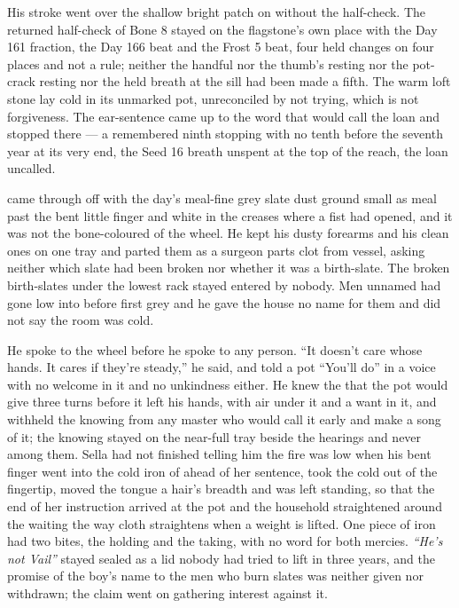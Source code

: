 His stroke went over the shallow bright patch on  without the half-check. The returned half-check of Bone 8 stayed on the flagstone’s own place with the Day 161 fraction, the Day 166 beat and the Frost 5 beat, four held changes on four places and not a rule; neither the handful nor the thumb’s resting nor the pot-crack resting nor the held breath at the sill had been made a fifth. The warm loft stone lay cold in its unmarked pot, unreconciled by not trying, which is not forgiveness. The ear-sentence came up to the word that would call the loan and stopped there --- a remembered ninth stopping with no tenth before the seventh year at its very end, the Seed 16 breath unspent at the top of the reach, the loan uncalled.

 came through  off  with the day’s meal-fine grey slate dust ground small as meal past the bent little finger and white in the creases where a fist had opened, and it was not the bone-coloured  of the wheel. He kept his dusty forearms and his clean ones on one tray and parted them as a surgeon parts clot from vessel, asking neither which slate had been broken nor whether it was a birth-slate. The broken birth-slates under the lowest rack stayed entered by nobody. Men unnamed had gone low into  before first grey and he gave the house no name for them and did not say the room was cold.

He spoke to the wheel before he spoke to any person. “It doesn’t care whose hands. It cares if they’re steady,” he said, and told a pot “You’ll do” in a voice with no welcome in it and no unkindness either. He knew the  that the pot would give three turns before it left his hands, with air under it and a want in it, and withheld the knowing from any  master who would call it early and make a song of it; the knowing stayed on the near-full tray beside the hearings and never among them. Sella had not finished telling him the fire was low when his bent finger went into the cold iron of  ahead of her sentence, took the cold out of the fingertip, moved the tongue a hair’s breadth and was left standing, so that the end of her instruction arrived at the pot and the household straightened around the waiting the way cloth straightens when a weight is lifted. One piece of iron had two bites, the holding and the taking, with no  word for both mercies. \emph{“He’s not Vail”} stayed sealed as a lid nobody had tried to lift in three years, and the promise of the boy’s name to the men who burn slates was neither given nor withdrawn; the claim went on gathering interest against it.

